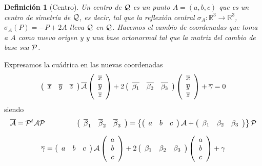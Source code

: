 \documentclass[11pt, a4paper, titlepage]{article}
\theoremstyle{theorem-style}
\theoremstyle{definition-style}
\newtheorem{ndef}{Definición}[section]
\theoremstyle{remark-style}
\theoremstyle{example-style}
\begin{document}
\begin{ndef}[Centro]
	Un {\it centro} de $\cal Q$ es un punto $A=(a,b,c)$ que es un centro de simetr\'ia de $\cal Q$, es decir, tal que la reflexi\'on central $\sigma_A:\mathbb{R}^3\longrightarrow\mathbb{R}^3$, $\sigma_A(P)= -P+2A$ lleva  $\cal Q$ en $\cal Q$. Hacemos el cambio de coordenadas que toma a $A$ como nuevo origen y 
y una base ortonormal tal que la matriz del cambio de base sea $\cal P$.
\end{ndef}


Expresamos la cu\'adrica en las nuevas coordenadas
\[ 
\left( \begin{array}{ccc} 
\overline{x} & \overline{y} & \overline{z}   
 \end{array} \right)\overline{{\cal A}}
\left(\begin{array}{c}
\overline{x} \\
\overline{y} \\
\overline{z}  
\end{array} \right)
+
2
 \left( \begin{array}{ccc}
\overline{\beta_1} & \overline{\beta_2} & \overline{\beta_3}   
 \end{array} \right)
\left( \begin{array}{c}
\overline{x} \\
\overline{y} \\
\overline{z}  
 \end{array} \right)
+ \overline{\gamma} = 0
\]
siendo
\[
\overline{{\cal A}} = {\cal P}^t{\cal A}{\cal P} \hspace{1.5cm}
\left( \begin{array}{ccc}
\overline{\beta}_1 & \overline{\beta}_2 & \overline{\beta}_3   
 \end{array} \right) = 
  \left\{
\left( \begin{array}{ccc} 
a &  b &  c 
 \end{array} \right){\cal A} +
 \left( \begin{array}{ccc}
\beta_1 & \beta_2 & \beta_3   
 \end{array} \right) \right\}
{\cal P}
\]


\[
 \overline{\gamma} = \left( \begin{array}{ccc} 
a &  b & c 
 \end{array} \right){\cal A}
\left(\begin{array}{c}
a  \\
b \\
c  
\end{array} \right)  + 
2 \left( \begin{array}{ccc}
\beta_1 & \beta_2 & \beta_3   
 \end{array} \right)
\left( \begin{array}{c}
a \\
b \\
c  
 \end{array} \right)
+ \gamma
\]
\end{document}
